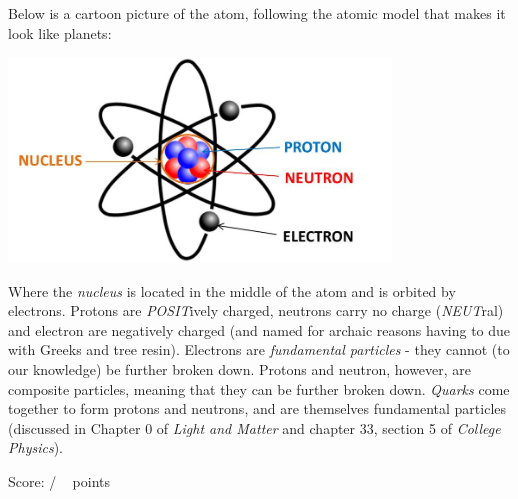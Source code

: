 \documentclass[addpoints,12pt]{exam}
\begin{document}
Below is a cartoon picture of the atom, following the atomic model that makes it look like planets:

\noindent \begin{center}\includegraphics[width=4in]{../images/atom.jpg}\end{center}

Where the \textit{nucleus} is located in the middle of the atom and is orbited by electrons. Protons are \textit{POSIT}ively charged, neutrons carry no charge (\textit{NEUT}ral) and electron are negatively charged (and named for archaic reasons having to due with Greeks and tree resin). Electrons are \textit{fundamental particles} - they cannot (to our knowledge) be further broken down. Protons and neutron, however, are composite particles, meaning that they can be further broken down. \textit{Quarks} come together to form protons and neutrons, and are themselves fundamental particles (discussed in Chapter 0 of \textit{Light and Matter} and chapter 33, section 5 of \textit{College Physics}).

 
\clearpage

\begin{flushright}
Score: \hspace{0.2in} / \numpoints ~ points
\end{flushright}
\end{document}
